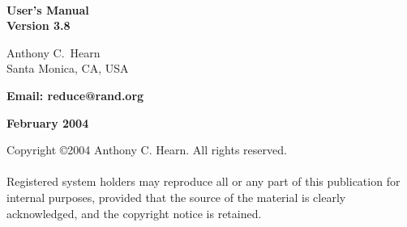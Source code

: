 \begin{titlepage}
\vspace*{\fill}
\begin{center}

{\Huge\bf {\REDUCE}} \\ [0.2cm]
{\LARGE\bf User's Manual\vspace{0.4cm} \\
  Version 3.8}

\vspace{0.5in}\large\bf

Anthony C.\ Hearn \\
Santa Monica, CA, USA

\vspace{0.1in}

\bf Email: reduce@rand.org

\vspace{0.5in}

\large\bf February 2004

\end{center}
\vspace{3.0in}
\end{titlepage}

\newpage
\vspace*{3.0in}
\noindent Copyright \copyright 2004 Anthony C. Hearn.  All rights reserved. \\
\mbox{}\\
%
\noindent Registered system holders may reproduce all or any part of this
publication for internal purposes, provided that the source of the
material is clearly acknowledged, and the copyright notice is retained.

